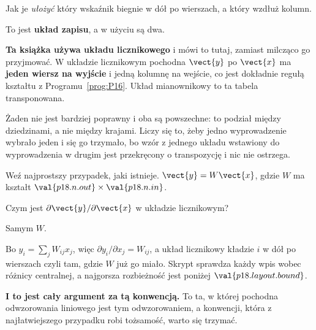 \begin{fr}
\begin{ansblock}
Jak je \emph{ułożyć} \dash{} który wskaźnik biegnie w dół po wierszach, a
który wzdłuż kolumn.
\end{ansblock}

To jest \textbf{układ zapisu}, a w użyciu są dwa.

\begin{notationbox}
\textbf{Ta książka używa układu licznikowego} i mówi to tutaj, zamiast
milcząco go przyjmować. W układzie licznikowym pochodna $\vect{y}$ po
$\vect{x}$ ma \textbf{jeden wiersz na wyjście} i jedną kolumnę na wejście, co
jest dokładnie regułą kształtu z Programu~\ref{prog:P16}. Układ mianownikowy
to ta tabela transponowana.

Żaden nie jest bardziej poprawny i oba są powszechne: to podział między
dziedzinami, a nie między krajami. Liczy się to, żeby jedno wyprowadzenie
wybrało jeden i się go trzymało, bo wzór z jednego układu wstawiony do
wyprowadzenia w drugim jest przekręcony o transpozycję i nic nie ostrzega.
\end{notationbox}

\end{fr}

\begin{fr}
Weź najprostszy przypadek, jaki istnieje. $\vect{y} = W\vect{x}$, gdzie $W$
ma kształt $\val{p18.n.out} \times \val{p18.n.in}$.

Czym jest $\partial \vect{y} / \partial \vect{x}$ w układzie licznikowym?
\nextframe
\end{fr}

\begin{fr}
\begin{ansblock}
Samym $W$.
\end{ansblock}

Bo $y_i = \sum_j W_{ij}x_j$, więc $\partial y_i / \partial x_j = W_{ij}$, a
układ licznikowy kładzie $i$ w dół po wierszach \dash{} czyli tam, gdzie $W$
już go miało. Skrypt sprawdza każdy wpis wobec różnicy centralnej, a
najgorsza rozbieżność jest poniżej $\val{p18.layout.bound}$.

\textbf{I to jest cały argument za tą konwencją.} To ta, w której pochodna
odwzorowania liniowego jest tym odwzorowaniem, a konwencji, która z
najłatwiejszego przypadku robi tożsamość, warto się trzymać.
\end{fr}

